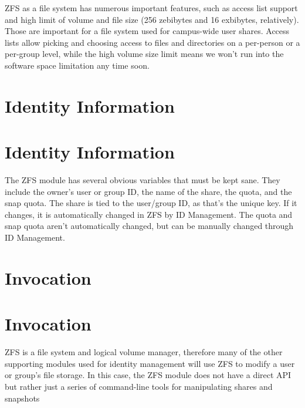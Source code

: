\documentclass[letterpaper,12pt,titlepage]{article}
\begin{document}
ZFS as a file system has numerous important features, such as access list support and high limit of volume and file size (256 zebibytes and 16 exbibytes, relatively). Those are important for a file system used for campus-wide user shares. Access lists allow picking and choosing access to files and directories on a per-person or a per-group level, while the high volume size limit means we won't run into the software space limitation any time soon. 

\section{Identity Information}

\section{Identity Information}
The ZFS module has several obvious variables that must be kept sane. They include the owner's user or group ID, the name of the share, the quota, and the snap quota. The share is tied to the user/group ID, as that's the unique key. If it changes, it is automatically changed in ZFS by ID Management. The quota and snap quota aren't automatically changed, but can be manually changed through ID Management. 

\section{Invocation}

\section{Invocation}
ZFS is a file system and logical volume manager, therefore many of the other supporting modules used for identity management will use ZFS to modify a user or group's file storage. In this case, the ZFS module does not have a direct API but rather just a series of command-line tools for manipulating shares and snapshots
\end{document}
